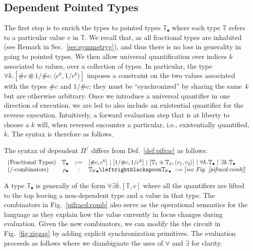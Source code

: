 \documentclass[a4paper,USenglish]{lipics-v2016-utf8x}
\newcommand{\hash}{\#}
\newcommand{\alt}{~|~}
\newcommand{\order}[1]{\hash #1}
\newcommand{\iorder}[1]{1/\hash #1}
\begin{document}
\subsection{Dependent Pointed Types}\label{sec:deppointedtypes}

The first step is to enrich the types to pointed types $\mathbb{T_\bullet}$
where each type $\mathbb{T}$ refers to a particular value $v$ in
$\mathbb{T}$. We recall that, as all fractional types are inhabited (see Remark
in Sec.~\ref{sec:symmetryg}), and thus there is no loss in generality in going
to pointed types. We then allow universal quantification over indices $k$
associated to values, over a collection of types.  In particular, the type
$\forall k.[\order{c} \circledast \iorder{c}, \langle c^k, 1/c^k \rangle]$
imposes a constraint on the two values associated with the types $\order{c}$ and
$\iorder{c}$; they must be ``synchronized'' by sharing the same~$k$ but are
otherwise arbitrary. Once we introduce a universal quantifier in one direction
of execution, we are led to also include an existential quantifier for the
reverse execution. Intuitively, a forward evaluation step that is at liberty to
choose a $k$ will, when reversed encounter a particular, i.e., existentially
quantified, $k$. The syntax is therefore as follows.

\begin{definition}[Dependent $\Pi^/$]
\label{def:pifracd}
The syntax of dependent $\Pi^/$ differs from Def.~\ref{def:pifrac} as follows:
\[\begin{array}{lrcl}
(\textrm{Fractional Types}) & \mathbb{T_\bullet} &::=&
  [\order{c},c^k] \alt
  [\iorder{c},1/c^k] \alt
  [\mathbb{T}_1 \circledast \mathbb{T}_2,\langle v_1,v_2 \rangle] \alt
  \forall k.\mathbb{T_\bullet} \alt \exists k.\mathbb{T_\bullet} \\
 (\textrm{/-combinators}) & \rho_\bullet &:&
  \mathbb{T_1}_{\bullet} \leftrightblackspoon \mathbb{T_2}_{\bullet} ~::=
  [\textit{see Fig.~\ref{pifracd:comb}}]
\end{array}\]
\end{definition}

A type $\mathbb{T}_\bullet$ is generally of the form
$\forall\exists{\overline{k}}.[\mathbb{T},v]$ where all the quantifiers are
lifted to the top leaving a non-dependent type and a value in that type. The
combinators in Fig.~\ref{pifracd:comb} also serve as the operational semantics
for the language as they explain how the value currently in focus changes during
evaluation. Given the new combinators, we can modify the the circuit in
Fig.~\ref{fig:zigzag} by adding explicit synchronization primitives. The
evaluation proceeds as follows where we diambiguate the uses of $\forall$ and
$\exists$ for clarity.
\end{document}
